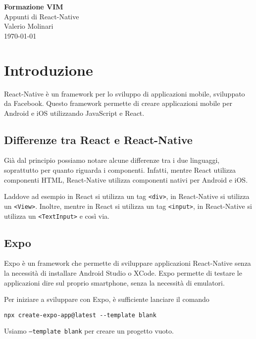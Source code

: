 \documentclass[12pt]{article}
\begin{document}
\begin{titlepage}
\begin{center}
\vspace*{3cm}
\Huge\textcolor{primary}{\textbf{Formazione VIM}} \\[1cm]
\Large\textcolor{secondary}{Appunti di React-Native} \\[1cm]
\textcolor{accent}{Valerio Molinari}\\
\vfill
\today
\end{center}
\end{titlepage}

\tableofcontents
\newpage

\section{Introduzione}
React-Native è un framework per lo sviluppo di applicazioni mobile, sviluppato da Facebook. 
Questo framework permette di creare applicazioni mobile per Android e iOS utilizzando JavaScript e React.

\subsection{Differenze tra React e React-Native}
Già dal principio possiamo notare alcune differenze tra i due linguaggi, soprattutto
per quanto riguarda i componenti. Infatti, mentre React utilizza componenti HTML, React-Native
utilizza componenti nativi per Android e iOS.

Laddove ad esempio in React si utilizza un tag \texttt{<div>}, in React-Native si utilizza un
\texttt{<View>}. Inoltre, mentre in React si utilizza un tag \texttt{<input>}, in React-Native si
utilizza un \texttt{<TextInput>} e così via.

\subsection{Expo}
Expo è un framework che permette di sviluppare applicazioni React-Native senza la necessità di
installare Android Studio o XCode. Expo permette di testare le applicazioni dire
sul proprio smartphone, senza la necessità di emulatori.

Per iniziare a sviluppare con Expo, è sufficiente lanciare il comando
\begin{highlight}
\begin{verbatim}
npx create-expo-app@latest --template blank
\end{verbatim}
\end{highlight}
Usiamo \texttt{--template blank} per creare un progetto vuoto.
\end{document}
